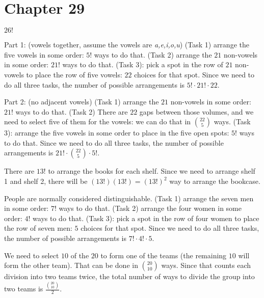    \section*{Chapter 29}
    
\begin{Solution}{29.1}

$26!$

\end{Solution}

\begin{Solution}{29.2}

Part 1: (vowels together, assume the vowels are {\it a,e,i,o,u})  (Task 1) arrange the five vowels in some order: $5!$ ways to do that. (Task 2) arrange the $21$ non-vowels in some order: $21!$ ways to do that. (Task 3): pick a spot in the row of $21$ non-vowels to place the row of five vowels: $22$ choices for that spot. Since we need to do all three tasks, the number
of possible arrangements is $5!\cdot21!\cdot22$. 


Part 2: (no adjacent vowels) (Task 1) arrange the $21$ non-vowels in some order: $21!$ ways to do that. (Task 2) There are $22$ gaps between those volumes, and we need to select five of them for the vowels: we can do that in $\binom{22}{5}$ ways. (Task 3): arrange the five vowels in some order to place in the five open spots: $5!$ ways to do that. Since we need to do all three tasks, the number
of possible arrangements is $21!\cdot\binom{22}{5}\cdot5!$. 

\end{Solution}

\begin{Solution}{29.3}
There are $13!$ to arrange the books for each shelf. Since we need to arrange shelf 1 and shelf 2, there will be $(13!)(13!) = (13!)^2$ way to arrange the bookcase.


\end{Solution}

\begin{Solution}{29.4}
People are normally considered distinguishable. (Task 1) arrange the seven men in some order: $7!$ ways to do that. (Task 2) arrange the four  women in some order: $4!$ ways to do that. (Task 3): pick a spot in the row of four women to place the row of seven men: $5$ choices for that spot. Since we need to do all three tasks, the number
of possible arrangements is $7!\cdot4!\cdot5$. 

\end{Solution}

\begin{Solution}{29.5}

We need to select $10$ of the $20$ to form one of the teams (the remaining $10$ will form the other team).
That can be done in $\binom{20}{10}$ ways. Since that counts each division into two teams twice, the total
number of ways to divide the group into two teams is $\frac{\binom{20}{10}}{2}$.

\end{Solution}

